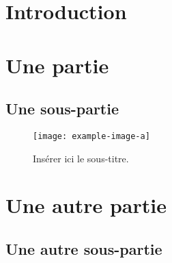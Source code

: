 \documentclass[a4paper,12pt,french]{article}
\begin{document}
\thispagestyle{empty}
\tableofcontents


\section{Introduction}


\newpage
\section{Une partie}

\subsection{Une sous-partie}

\lipsum[1]

\begin{figure}[ht!]
    \centering
    \texttt{[image: example-image-a]}
    \caption{Insérer ici le sous-titre.}
    \label{fig:id-de-la-figure}
\end{figure}




\section{Une autre partie}

\subsection{Une autre sous-partie}
\lipsum[2]

\end{document}
